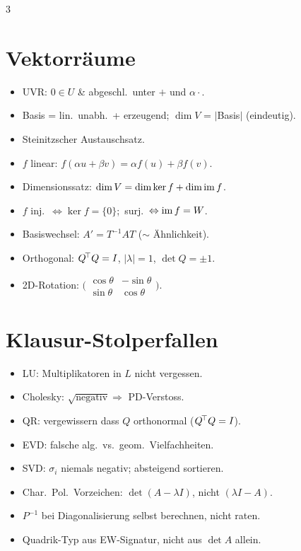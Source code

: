 \documentclass[8pt,a4paper]{extarticle}
\begin{document}
\begin{multicols*}{3}
\section{Vektorr\"aume}
\begin{itemize}
\item UVR: $0\!\in\!U$ \& abgeschl.\ unter $+$ und $\alpha\cdot$.
\item Basis = lin.\ unabh.\ + erzeugend; $\dim V$ = $|$Basis$|$ (eindeutig).
\item Steinitzscher Austauschsatz.
\item $f$ linear: $f(\alpha u+\beta v)=\alpha f(u)+\beta f(v)$.
\item Dimensionssatz: $\dim V=\dim\ker f+\dim\operatorname{im} f$.
\item $f$ inj.\ $\Leftrightarrow\ker f=\{0\}$;\ surj.\ $\Leftrightarrow\operatorname{im} f=W$.
\item Basiswechsel: $A'=T^{-1}AT$ ($\sim$ \"Ahnlichkeit).
\item Orthogonal: $Q^{\!\top} Q=I$, $|\lambda|=1$, $\det Q=\pm 1$.
\item 2D-Rotation: $\bigl(\begin{smallmatrix}\cos\theta&-\sin\theta\\ \sin\theta&\cos\theta\end{smallmatrix}\bigr)$.
\end{itemize}

\section{Klausur-Stolperfallen}
\begin{itemize}
\item LU: Multiplikatoren in $L$ nicht vergessen.
\item Cholesky: $\sqrt{\text{negativ}}\Rightarrow$ PD-Verstoss.
\item QR: vergewissern dass $Q$ orthonormal ($Q^{\!\top} Q=I$).
\item EVD: falsche alg.\ vs.\ geom.\ Vielfachheiten.
\item SVD: $\sigma_i$ niemals negativ; absteigend sortieren.
\item Char.\ Pol.\ Vorzeichen: $\det(A-\lambda I)$, nicht $(\lambda I-A)$.
\item $P^{-1}$ bei Diagonalisierung selbst berechnen, nicht raten.
\item Quadrik-Typ aus EW-Signatur, nicht aus $\det A$ allein.
\end{itemize}

\end{multicols*}
\end{document}
